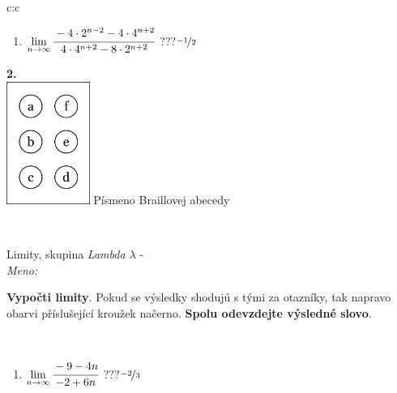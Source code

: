 \documentclass[10pt]{report}
\begin{document}
\begin{tabular}{c:c}
\begin{minipage}[c][104.5mm][t]{0.5\linewidth}
\begin{center}
\begin{minipage}{0.79\linewidth}
\begin{center}
\begin{varwidth}{\linewidth}
\begin{enumerate}
\item $\lim\limits_{n\to\infty}\cfrac{-4\cdot 2^{n-2}-4\cdot 4^{n+2}}{4\cdot 4^{n+2}-8\cdot 2^{n+2}}$\quad \dotfill\; ???\;\dotfill \quad $\nicefrac{-1}{2}$
\end{enumerate}
\end{varwidth}
\end{center}
\end{minipage}
\begin{minipage}{0.20\linewidth}
\begin{center}
{\Huge\bfseries 2.} \\[2mm]
\includegraphics[height=40mm]{../images/braille.png}
{\small Písmeno Braillovej abecedy}
\end{center}
\end{minipage}
\end{center}
\end{minipage}
\\ \hdashline
\begin{minipage}[c][104.5mm][t]{0.5\linewidth}
\begin{center}
\vspace{7mm}
{\huge Limity, skupina \textit{Lambda $\lambda$} -}\\[5mm]
\textit{Meno:}\phantom{xxxxxxxxxxxxxxxxxxxxxxxxxxxxxxxxxxxxxxxxxxxxxxxxxxxxxxxxxxxxxxxxx}\\[5mm]
\begin{minipage}{0.95\linewidth}
\begin{center}
\textbf{Vypočti limity}. Pokud se výsledky shodujú s tými za otazníky, tak napravo\\obarvi příslušející kroužek načerno. \textbf{Spolu odevzdejte výsledné slovo}.
\end{center}
\end{minipage}
\\[1mm]
\begin{minipage}{0.79\linewidth}
\begin{center}
\begin{varwidth}{\linewidth}
\begin{enumerate}
\normalsize
\item $\lim\limits_{n\to\infty}\cfrac{-9-4n}{-2+6n}$\quad \dotfill\; ???\;\dotfill \quad $\nicefrac{-2}{3}$

\end{enumerate}
\end{varwidth}
\end{center}
\end{minipage}
\end{center}
\end{minipage}
\end{tabular}
\end{document}
